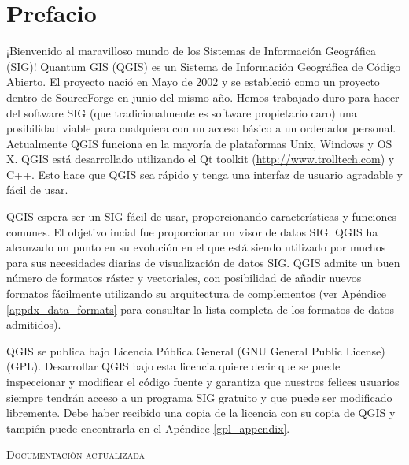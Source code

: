 
\section{Prefacio}\label{label_forward}
\setcounter{page}{1}


¡Bienvenido al maravilloso mundo de los Sistemas de Información Geográfica (SIG)!
Quantum GIS (QGIS) es un Sistema de Información Geográfica de Código Abierto. 
El proyecto nació en Mayo de 2002 y se estableció como un proyecto dentro de 
SourceForge en junio del mismo año. Hemos trabajado duro para hacer del 
software SIG (que tradicionalmente es software propietario caro) una posibilidad
viable para cualquiera con un acceso básico a un ordenador personal. 
Actualmente QGIS funciona en la mayoría de plataformas Unix, Windows y OS X. 
QGIS está desarrollado utilizando el Qt toolkit (\url{http://www.trolltech.com})
y C++. Esto hace que QGIS sea rápido y tenga una interfaz de usuario agradable
y fácil de usar.

QGIS espera ser un SIG fácil de usar, proporcionando características y 
funciones comunes. El objetivo incial fue proporcionar un visor de datos SIG. 
QGIS ha alcanzado un punto en su evolución en el que está siendo utilizado por muchos 
para sus necesidades diarias de visualización de datos SIG. QGIS admite un 
buen número de formatos ráster y vectoriales, con posibilidad de añadir nuevos formatos fácilmente
utilizando su arquitectura de complementos (ver Apéndice \ref{appdx_data_formats} 
para consultar la lista completa de los formatos de datos admitidos).

QGIS se publica bajo Licencia Pública General (GNU General Public License) (GPL). 
Desarrollar QGIS bajo esta licencia quiere decir que se puede inspeccionar y 
modificar el código fuente y garantiza que nuestros felices 
usuarios siempre tendrán acceso a un programa SIG gratuito y que puede ser 
modificado libremente. Debe haber recibido una copia de la licencia con su copia 
de QGIS y tampién puede encontrarla en el Apéndice \ref{gpl_appendix}.

\begin{Tip}\caption{\textsc{Documentación actualizada}}
\end{Tip}

